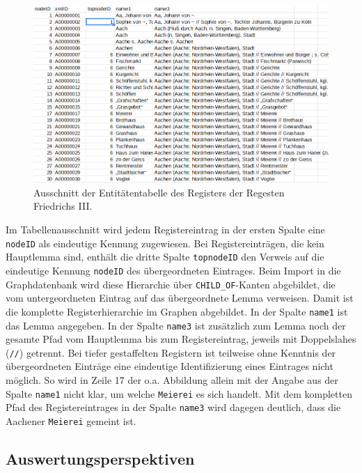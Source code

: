 \begin{figure}
\centering
\includegraphics{Bilder/RI2Graph/RegisterF3-Hierarchie.png}
\caption{Ausschnitt der Entitätentabelle des Registers der Regesten
Friedrichs III.}
\end{figure}

Im Tabellenausschnitt wird jedem Registereintrag in der ersten Spalte
eine \texttt{nodeID} als eindeutige Kennung zugewiesen. Bei
Registereinträgen, die kein Hauptlemma sind, enthält die dritte Spalte
\texttt{topnodeID} den Verweis auf die eindeutige Kennung
\texttt{nodeID} des übergeordneten Eintrages. Beim Import in die
Graphdatenbank wird diese Hierarchie über \texttt{CHILD\_OF}-Kanten
abgebildet, die vom untergeordneten Eintrag auf das übergeordnete Lemma
verweisen. Damit ist die komplette Registerhierarchie im Graphen
abgebildet. In der Spalte \texttt{name1} ist das Lemma angegeben. In der
Spalte \texttt{name3} ist zusätzlich zum Lemma noch der gesamte Pfad vom
Hauptlemma bis zum Registereintrag, jeweils mit Doppelslahes
(\texttt{//}) getrennt. Bei tiefer gestaffelten Registern ist teilweise
ohne Kenntnis der übergeordneten Einträge eine eindeutige
Identifizierung eines Eintrages nicht möglich. So wird in Zeile 17 der
o.a. Abbildung allein mit der Angabe aus der Spalte \texttt{name1} nicht
klar, um welche \texttt{Meierei} es sich handelt. Mit dem kompletten
Pfad des Registereintrages in der Spalte \texttt{name3} wird dagegen
deutlich, dass die Aachener \texttt{Meierei} gemeint ist.

\hypertarget{auswertungsperspektiven}{%
\subsection{Auswertungsperspektiven}\label{auswertungsperspektiven}}

